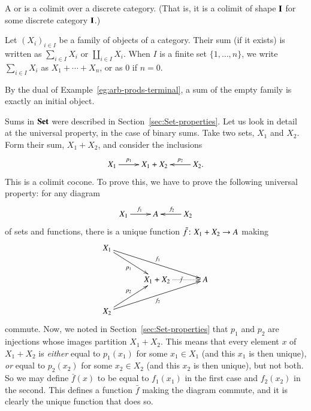 \begin{defn}
A %
%
%
or %
%
%
is a colimit over a discrete category.  (That is, it is a colimit of shape
$\mathbf{I}$ for some discrete category $\mathbf{I}$.)
\end{defn}
% 
Let $(X_i)_{i \in I}$ be a family of objects of a category.  Their sum (if
it exists) is written as $\sum_{i \in I} X_i$%
%
%
or $\coprod_{i \in I} X_i$.%
%
%
When
$I$ is a finite set $\{1, \ldots, n\}$, we write $\sum_{i \in I} X_i$ as $X_1
+ \cdots + X_n$,%
%
%
or as $0$%
%
%
if $n = 0$.  

\begin{example}        
\label{eg:sums-init}
By the dual of Example~\ref{eg:arb-prods-terminal}, a sum of the empty%
%
%
%
%
family is exactly an initial%
%
%
object.
\end{example}

\begin{example}
Sums in $\mathbf{Set}$%
%
%
were described in Section~\ref{sec:Set-properties}.  Let us look in detail
at the universal property, in the case of binary sums.  Take two sets,
$X_1$ and $X_2$.  Form their sum, $X_1 + X_2$, and consider the inclusions
\[
\xymatrix{
X_1 \ar[r]^-{p_1} &X_1 + X_2     &X_2. \ar[l]_-{p_2}
}
\]
This is a colimit cocone.  To prove this, we have to prove the
following universal property: for any diagram 
\[
\xymatrix{
X_1 \ar[r]^{f_1} &A     & X_2 \ar[l]_{f_2}
}
\]
of sets and functions, there is a unique function $\bar{f}\from X_1 + X_2 \to
A$ making
\[
\xymatrix@C+2ex{
X_1 \ar[rrd]^{f_1} \ar[rd]_{p_1}        &       &       \\
        &
X_1 + X_2 \ar@{.>}[r]|{\bar{f}}   &A   \\
X_2 \ar[ru]^{p_2} \ar[rru]_{f_2}
}
\]
commute.  Now, we noted in Section~\ref{sec:Set-properties} that $p_1$ and
$p_2$ are injections whose images partition $X_1 + X_2$.  This means that
every element $x$ of $X_1 + X_2$ is \emph{either} equal to $p_1(x_1)$ for
some $x_1 \in X_1$ (and this $x_1$ is then unique), \emph{or} equal to
$p_2(x_2)$ for some $x_2 \in X_2$ (and this $x_2$ is then unique), but not
both.  So we may define $\bar{f}(x)$ to be equal to $f_1(x_1)$ in the first
case and $f_2(x_2)$ in the second.  This defines a function $\bar{f}$
making the diagram commute, and it is clearly the unique function that does
so. 
\end{example}

